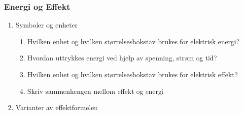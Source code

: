 \documentclass[12pt,a4paper]{article}
\begin{document}
\subsubsection{Energi og Effekt}
\begin{enumerate}
\item Symboler og enheter

\begin{enumerate}
\item Hvilken enhet og hvilken størrelsesbokstav brukes for elektrisk energi?
\\
\item Hvordan uttrykkes energi ved hjelp av spenning, strøm og tid?
\\
\item Hvilken enhet og hvilken størrelsesbokstav brukes for elektrisk effekt?
\\
\item Skriv sammenhengen mellom effekt og energi
\\
\end{enumerate}
\item Varianter av effektformelen


\end{enumerate}
\end{document}
